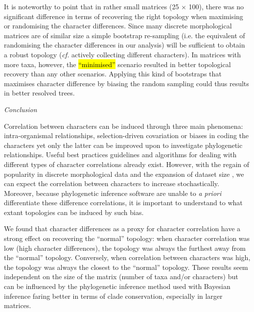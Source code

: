 \documentclass[12pt,letterpaper]{article}
\renewcommand{\subsection}[1]{%
\bigskip
\begin{center}
\begin{large}
\normalfont\itshape #1
\end{large}
\end{center}}
\begin{document}
It is noteworthy to point that in rather small matrices (25 $\times$ 100), there was no significant difference in terms of recovering the right topology when maximising or randomising the character differences.
Since many discrete morphological matrices are of similar size \citep{guillerme2016assessment} a simple bootstrap re-sampling (i.e. the equivalent of randomising the character differences in our analysis) will be sufficient to obtain a robust topology (\textit{cf.} actively collecting different characters).
In matrices with more taxa, however, the \hl{``minimised''} scenario resulted in better topological recovery than any other scenarios.
Applying this kind of bootstraps that maximises character difference by biasing the random sampling could thus results in better resolved trees.

\subsection{Conclusion}
Correlation between characters can be induced through three main phenomena: intra-organismal relationships, selection-driven covariation or biases in coding the characters yet only the latter can be improved upon to investigate phylogenetic relationships.
Useful best practices guidelines \citep[e.g.][]{Brazeau2011,simoes2017giant} and algorithms for dealing with different types of character correlations \citep[e.g. for characters hierarchy][]{de2015parsimony,BrazeauNA} already exist.
However, with the regain of popularity in discrete morphological data and the expansion of dataset size \citep[e.g.][with more than 1000 characters each]{nithe2013,O'Leary08022013}, we can expect the correlation between characters to increase stochastically.
Moreover, because phylogenetic inference software are unable to \textit{a priori} differentiate these difference correlations, it is important to understand to what extant topologies can be induced by such bias.

We found that character differences as a proxy for character correlation have a strong effect on recovering the ``normal'' topology: when character correlation was low (high character differences), the topology was always the furthest away from the ``normal'' topology.
Conversely, when correlation between characters was high, the topology was always the closest to the ``normal'' topology.
These results seem independent on the size of the matrix (number of taxa and/or characters) but can be influenced by the phylogenetic inference method used with Bayesian inference faring better in terms of clade conservation, especially in larger matrices.
\end{document}
